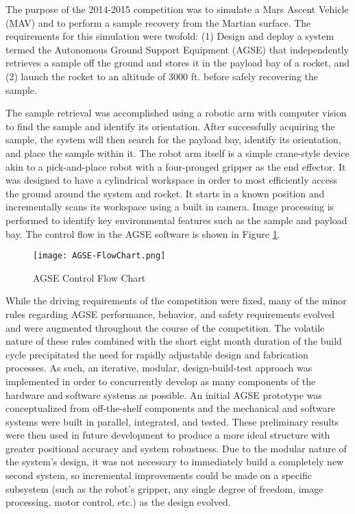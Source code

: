 The purpose of the 2014-2015 competition was to simulate a Mars Ascent
Vehicle (MAV) and to perform a sample recovery from the Martian
surface. The requirements for this simulation were twofold: (1) Design
and deploy a system termed the Autonomous Ground Support Equipment
(AGSE) that independently retrieves a sample off the ground and stores
it in the payload bay of a rocket, and (2) launch the rocket to an
altitude of 3000 ft. before safely recovering the sample.

The sample retrieval was accomplished using a robotic arm with
computer vision to find the sample and identify its orientation. After
successfully acquiring the sample, the system will then search for the
payload bay, identify its orientation, and place the sample within it.
The robot arm itself is a simple crane-style device akin to a
pick-and-place robot with a four-pronged gripper as the end effector.
It was designed to have a cylindrical workspace in order to most
efficiently access the ground around the system and rocket. It starts
in a known position and incrementally scans its workspace using a
built in camera. Image processing is performed to identify key
environmental features such as the sample and payload bay.  The
control flow in the AGSE software is shown in Figure
\ref{fig:AGSE-FlowChart}.

\begin{figure}[h]
	\centering
	\texttt{[image: AGSE-FlowChart.png]}
	\caption{AGSE Control Flow Chart}
	\label{fig:AGSE-FlowChart}
\end{figure}
\FloatBarrier

While the driving requirements of the competition were fixed, many of
the minor rules regarding AGSE performance, behavior, and safety
requirements evolved and were augmented throughout the course of the
competition. The volatile nature of these rules combined with the
short eight month duration of the build cycle precipitated the need
for rapidly adjustable design and fabrication processes. As such, an
iterative, modular, design-build-test approach was implemented in
order to concurrently develop as many components of the hardware and
software systems as possible. An initial AGSE prototype was
conceptualized from off-the-shelf components and the mechanical and
software systems were built in parallel, integrated, and tested. These
preliminary results were then used in future development to produce a
more ideal structure with greater positional accuracy and system
robustness.  Due to the modular nature of the system's design, it was
not necessary to immediately build a completely new second system, so
incremental improvements could be made on a specific subsystem (such
as the robot's gripper, any single degree of freedom, image
processing, motor control, etc.) as the design evolved.

